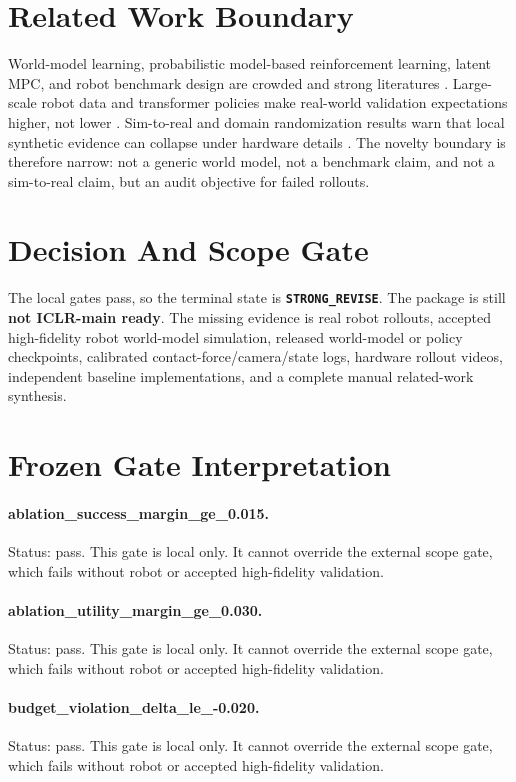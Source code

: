 \documentclass{article}
\begin{document}
\section{Related Work Boundary}
World-model learning, probabilistic model-based reinforcement learning, latent MPC, and robot benchmark design are crowded and strong literatures \citep{ha2018worldmodels,chua2018pets,hafner2019planet,hafner2020dreamer,janner2019mbpo,hansen2022tdmpc,yu2020metaworld,james2020rlbench,mandlekar2021robomimic,mu2021maniskill}. Large-scale robot data and transformer policies make real-world validation expectations higher, not lower \citep{brohan2023rt1,openx2023,khazatsky2024droid}. Sim-to-real and domain randomization results warn that local synthetic evidence can collapse under hardware details \citep{tobin2017domainrandomization,openai2019dexterous}. The novelty boundary is therefore narrow: not a generic world model, not a benchmark claim, and not a sim-to-real claim, but an audit objective for failed rollouts.
\section{Decision And Scope Gate}
The local gates pass, so the terminal state is \textbf{\texttt{STRONG\_REVISE}}. The package is still \textbf{not ICLR-main ready}. The missing evidence is real robot rollouts, accepted high-fidelity robot world-model simulation, released world-model or policy checkpoints, calibrated contact-force/camera/state logs, hardware rollout videos, independent baseline implementations, and a complete manual related-work synthesis.
\clearpage
\appendix
\section{Frozen Gate Interpretation}
\paragraph{ablation\_success\_margin\_ge\_0.015.} Status: pass. This gate is local only. It cannot override the external scope gate, which fails without robot or accepted high-fidelity validation.
\paragraph{ablation\_utility\_margin\_ge\_0.030.} Status: pass. This gate is local only. It cannot override the external scope gate, which fails without robot or accepted high-fidelity validation.
\paragraph{budget\_violation\_delta\_le\_-0.020.} Status: pass. This gate is local only. It cannot override the external scope gate, which fails without robot or accepted high-fidelity validation.
\end{document}
